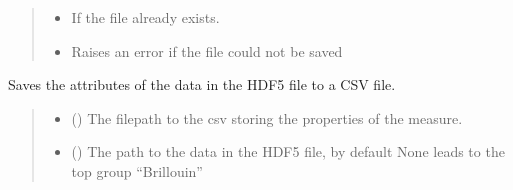 \documentclass[letterpaper,10pt,english]{sphinxmanual}
\begin{document}
\begin{fulllineitems}
\begin{fulllineitems}
\begin{quote}
\begin{description}
\begin{itemize}
\item {} 
\sphinxAtStartPar
{\hyperref[\detokenize{source/_autosummary/HDF5_BLS.errors:HDF5_BLS.errors.WrapperError_Overwrite}]{}} \textendash{} If the file already exists.

\item {} 
\sphinxAtStartPar
{\hyperref[\detokenize{source/_autosummary/HDF5_BLS.errors:HDF5_BLS.errors.WrapperError}]{}} \textendash{} Raises an error if the file could not be saved

\end{itemize}

\end{description}\end{quote}

\end{fulllineitems}


\begin{fulllineitems}
\label{\detokenize{source/_autosummary/HDF5_BLS.Wrapper:HDF5_BLS.Wrapper.save_properties_csv}}
\pysigstartsignatures
\pysiglinewithargsret
{}
{\sphinxparamcomma {}}
{}
\pysigstopsignatures
\sphinxAtStartPar
Saves the attributes of the data in the HDF5 file to a CSV file.
\begin{quote}\begin{description}
\begin{itemize}
\item {} 
\sphinxAtStartPar
{} () \textendash{} The filepath to the csv storing the properties of the measure.

\item {} 
\sphinxAtStartPar
{} (\sphinxstyleliteralemphasis{\sphinxupquote{, }}) \textendash{} The path to the data in the HDF5 file, by default None leads to the top group “Brillouin”


\end{itemize}
\end{description}
\end{quote}
\end{fulllineitems}
\end{fulllineitems}
\end{document}
